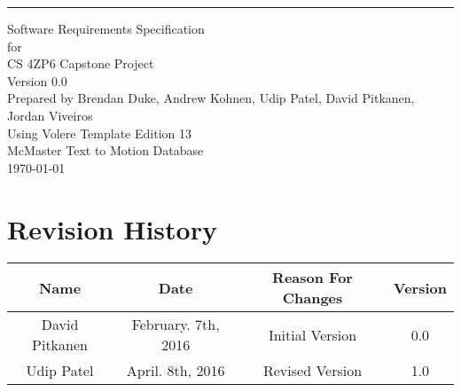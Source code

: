 \documentclass{scrreprt}
\date{}
\def\myversion{0.0 }
\begin{document}
\begin{flushright}
    \rule{16cm}{5pt}\vskip1cm
    \begin{bfseries}
        \Huge{Software Requirements Specification }\\
        \vspace{1.4cm}
        for\\
        \vspace{1.4cm}
        CS 4ZP6 Capstone Project\\
        \vspace{1.4cm}
        \LARGE{Version \myversion}\\
        \vspace{1.4cm}
        Prepared by Brendan Duke, Andrew Kohnen, Udip Patel, David Pitkanen, Jordan Viveiros\\
        \vspace{1.4cm}
        Using Volere Template Edition 13\\
        \vspace{1.4cm}
        McMaster Text to Motion Database\\
        \vspace{1.4cm}
        \today\\
    \end{bfseries}
\end{flushright}

\tableofcontents

\chapter*{Revision History}

\begin{center}
    \begin{tabular}{|c|c|c|c|}
        \hline
            Name & Date & Reason For Changes & Version\\
        \hline
	    David Pitkanen & February. 7th, 2016 & Initial Version & 0.0\\
        \hline
	    Udip Patel & April. 8th, 2016 & Revised Version & 1.0\\
        \hline
    \end{tabular}
\end{center}

\end{document}

